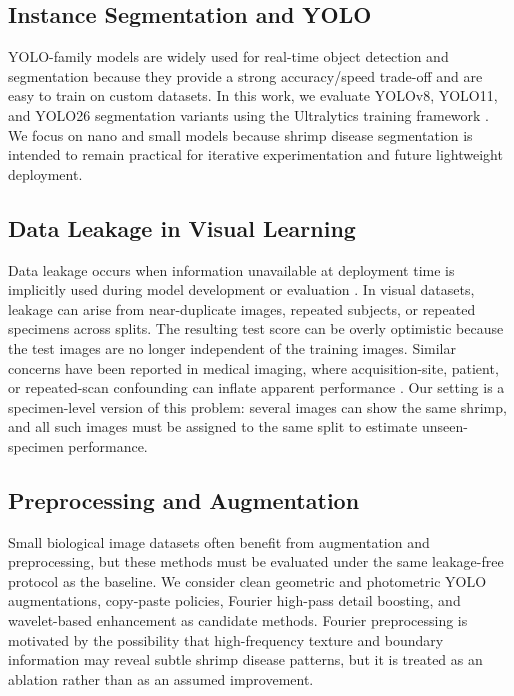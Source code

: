 \documentclass{svproc}
\begin{document}
\subsection{Instance Segmentation and YOLO}

YOLO-family models are widely used for real-time object detection and
segmentation because they provide a strong accuracy/speed trade-off and
are easy to train on custom datasets. In this work, we evaluate YOLOv8,
YOLO11, and YOLO26 segmentation variants using the Ultralytics training
framework \cite{ultralytics2026}. We focus on nano and small models
because shrimp disease segmentation is intended to remain practical for
iterative experimentation and future lightweight deployment.

\subsection{Data Leakage in Visual Learning}

Data leakage occurs when information unavailable at deployment time is
implicitly used during model development or evaluation
\cite{kaufman2012leakage}. In visual datasets, leakage can arise from
near-duplicate images, repeated subjects, or repeated specimens across
splits. The resulting test score can be overly optimistic because the
test images are no longer independent of the training images. Similar
concerns have been reported in medical imaging, where acquisition-site,
patient, or repeated-scan confounding can inflate apparent performance
\cite{zech2018confounding,roberts2021common,tampu2022inflation}. Our
setting is a specimen-level version of this problem: several images can
show the same shrimp, and all such images must be assigned to the same
split to estimate unseen-specimen performance.

\subsection{Preprocessing and Augmentation}

Small biological image datasets often benefit from augmentation and
preprocessing, but these methods must be evaluated under the same
leakage-free protocol as the baseline. We consider clean geometric and
photometric YOLO augmentations, copy-paste policies, Fourier high-pass
detail boosting, and wavelet-based enhancement as candidate methods.
Fourier preprocessing is motivated by the possibility that high-frequency
texture and boundary information may reveal subtle shrimp disease
patterns, but it is treated as an ablation rather than as an assumed
improvement.
\end{document}
